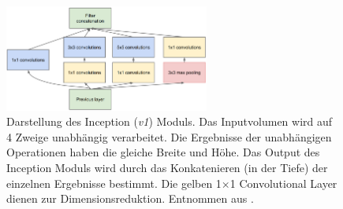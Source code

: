  \begin{figure}[H]
	\centering
	\includegraphics[width=0.60\textwidth]{images/googlenet/inception_module.png}
	\caption{Darstellung des Inception (\textit{v1}) Moduls. Das Inputvolumen wird auf 4 Zweige unabhängig verarbeitet. Die Ergebnisse der unabhängigen Operationen haben die gleiche Breite und Höhe. Das Output des Inception Moduls wird durch das Konkatenieren (in der Tiefe) der einzelnen Ergebnisse bestimmt. Die gelben 1$\times$1 Convolutional Layer dienen zur Dimensionsreduktion. Entnommen aus \cite{szegedyGoingDeeperConvolutions2015}.}
	\label{fig:inception_module}
\end{figure}

